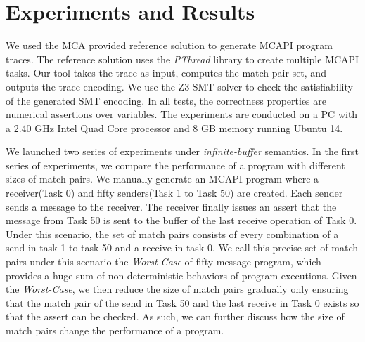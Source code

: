 \section{Experiments and Results}
We used the MCA provided reference solution to generate MCAPI program traces. The reference solution uses the \textit{PThread} library to create multiple MCAPI tasks. Our tool takes the trace as input, computes the match-pair set, and outputs the trace encoding. We use the Z3 SMT solver \cite{demoura:tacas08} to check the satisfiability of the generated SMT encoding. In all tests, the correctness properties are numerical assertions over variables. The experiments are conducted on a PC with a 2.40 GHz Intel Quad Core processor and 8 GB memory running Ubuntu 14.

We launched two series of experiments under \textit{infinite-buffer} semantics. In the first series of experiments, we compare the performance of a program with different sizes of match pairs. We manually generate an MCAPI program where a receiver(Task 0) and fifty senders(Task 1 to Task 50) are created. Each sender sends a message to the receiver. The receiver finally issues an assert that the message from Task 50 is sent to the buffer of the last receive operation of Task 0. Under this scenario, the set of match pairs consists of every combination of a send in task 1 to task 50 and a receive in task 0. We call this precise set of match pairs under this scenario the \textit{Worst-Case} of fifty-message program, which provides a huge sum of non-deterministic behaviors of program executions. Given the \textit{Worst-Case}, we then reduce the size of match pairs gradually only ensuring that the match pair of the send in Task 50 and the last receive in Task 0 exists so that the assert can be checked. As such, we can further discuss how the size of match pairs change the performance of a program.

